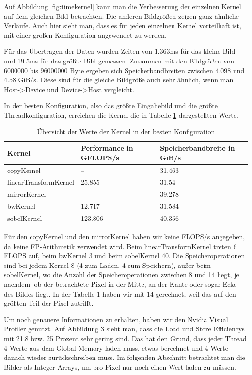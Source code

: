 \documentclass[12pt,a4paper]{scrartcl}
\begin{document}
Auf Abbildung \ref{fig:timekernel} kann man die Verbesserung der einzelnen Kernel auf dem gleichen Bild betrachten.
Die anderen Bildgr\"o\ss{}en zeigen ganz \"ahnliche Verl\"aufe.
Auch hier sieht man, dass es f\"ur jeden einzelnen Kernel vorteilhaft ist, mit einer gro\ss{}en Konfiguration angewendet zu werden.

F\"ur das \"Ubertragen der Daten wurden Zeiten von 1.363ms f\"ur das kleine Bild und 19.5ms f\"ur das gr\"o\ss{}te Bild gemessen.
Zusammen mit den Bildgr\"o\ss{}en von 6000000 bis 96000000 Byte ergeben sich Speicherbandbreiten zwischen 4.098 und 4.58 GiB/s.
Diese sind f\"ur die gleiche Bildgr\"o\ss{}e auch sehr \"ahnlich, wenn man Host->Device und Device->Host vergleicht.

In der besten Konfiguration, also das gr\"o\ss{}te Eingabebild und die gr\"o\ss{}te Threadkonfiguration, erreichen die Kernel die in Tabelle \ref{tab:perf} dargestellten Werte.

\begin{table}[h]
    \centering
    \begin{tabular}{l|l|l}
    \hline
    Kernel & Performance in GFLOPS/s & Speicherbandbreite in GiB/s \\
    \hline
    copyKernel & --                  & 31.463 \\
    linearTransformKernel & 25.855   & 31.54 \\
    mirrorKernel & --                & 39.278 \\
    bwKernel & 12.717                & 31.584 \\
    sobelKernel & 123.806            & 40.356 \\
    \hline
    \end{tabular}
    \caption{\"Ubersicht der Werte der Kernel in der besten Konfiguration}
    \label{tab:perf}
\end{table}

F\"ur den copyKernel und den mirrorKernel haben wir keine FLOPS/s angegeben, da keine FP-Arithmetik verwendet wird.
Beim linearTransformKernel treten 6 FLOPS auf, beim bwKernel 3 und beim sobelKernel 40.
Die Speicheroperationen sind bei jedem Kernel 8 (4 zum Laden, 4 zum Speichern), au\ss er beim sobelKernel, wo die Anzahl der Speicheroperationen zwischen 8 und 14 liegt, je nachdem, ob der betrachtete Pixel in der Mitte, an der Kante oder sogar Ecke des Bildes liegt.
In der Tabelle \ref{tab:perf} haben wir mit 14 gerechnet, weil das auf den gr\"o\ss{}ten Teil der Pixel zutrifft.

Um noch genauere Informationen zu erhalten, haben wir den Nvidia Visual Profiler genutzt.
Auf Abbildung 3 sieht man, dass die Load und Store Efficiencys mit 21.8 bzw. 25 Prozent sehr gering sind.
Das hat den Grund, dass jeder Thread 4 Werte aus dem Global Memory laden muss, etwas berechnet und 4 Werte danach wieder zur\"uckschreiben muss.
Im folgenden Abschnitt betrachtet man die Bilder als Integer-Arrays, um pro Pixel nur noch einen Wert laden zu m\"ussen.
\end{document}
